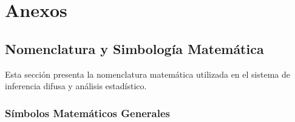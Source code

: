 
\chapter*{Anexos}


\section{Nomenclatura y Simbología Matemática}
\label{sec:nomenclatura}

Esta sección presenta la nomenclatura matemática utilizada en el sistema de inferencia difusa y análisis estadístico.

\subsection{Símbolos Matemáticos Generales}

